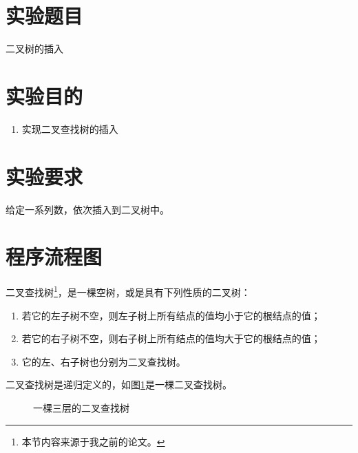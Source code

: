 \documentclass[cs4size,a4paper,nofonts]{ctexart}
\begin{document}
\newpage

\section{实验题目}
二叉树的插入
\section{实验目的}
\begin{enumerate}[topsep=0pt,partopsep=0pt,itemsep=0pt,parsep=0pt]
\item 实现二叉查找树的插入
\end{enumerate}
\section{实验要求}
给定一系列数，依次插入到二叉树中。

\begin{quote}

\end{quote}

\section{程序流程图}

二叉查找树\footnote{本节内容来源于我之前的论文\cite{sbt}。}，是一棵空树，或是具有下列性质的二叉树：
\begin{enumerate}[topsep=0pt,partopsep=0pt,itemsep=0pt,parsep=0pt]
\item 若它的左子树不空，则左子树上所有结点的值均小于它的根结点的值；
\item 若它的右子树不空，则右子树上所有结点的值均大于它的根结点的值；
\item 它的左、右子树也分别为二叉查找树。
\end{enumerate}

二叉查找树是递归定义的，如图\ref{aBST}是一棵二叉查找树。
\begin{figure}[htbp]
\begin{center}
\end{center}
\caption{\label{aBST}一棵三层的二叉查找树}
\end{figure}
\end{document}
